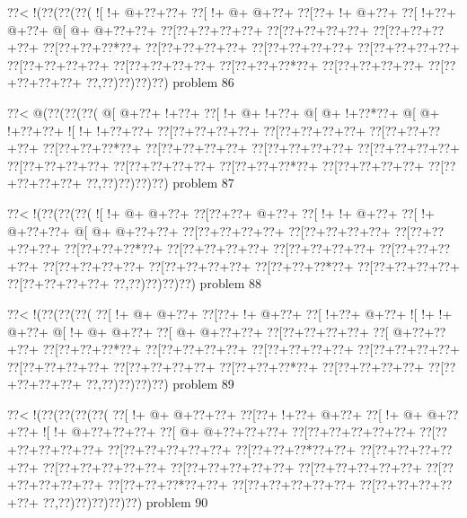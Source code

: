 \vbox{\vbox{\goo
\0??<\- !(\0??(\0??(\0??(
\- ![\- !+\- @+\0??+\0??+
\0??[\- !+\- @+\- @+\0??+
\0??[\0??+\- !+\- @+\0??+
\0??[\- !+\0??+\- @+\0??+
\- @[\- @+\- @+\0??+\0??+
\0??[\0??+\0??+\0??+\0??+
\0??[\0??+\0??+\0??+\0??+
\0??[\0??+\0??+\0??+\0??+
\0??[\0??+\0??+\0??*\0??+
\0??[\0??+\0??+\0??+\0??+
\0??[\0??+\0??+\0??+\0??+
\0??[\0??+\0??+\0??+\0??+
\0??[\0??+\0??+\0??+\0??+
\0??[\0??+\0??+\0??+\0??+
\0??[\0??+\0??+\0??*\0??+
\0??[\0??+\0??+\0??+\0??+
\0??[\0??+\0??+\0??+\0??+
\0??,\0??)\0??)\0??)\0??)
}
\hfil problem 86\hfil\break
}

\vbox{\vbox{\goo
\0??<\- @(\0??(\0??(\0??(
\- @[\- @+\0??+\- !+\0??+
\0??[\- !+\- @+\- !+\0??+
\- @[\- @+\- !+\0??*\0??+
\- @[\- @+\- !+\0??+\0??+
\- ![\- !+\- !+\0??+\0??+
\0??[\0??+\0??+\0??+\0??+
\0??[\0??+\0??+\0??+\0??+
\0??[\0??+\0??+\0??+\0??+
\0??[\0??+\0??+\0??*\0??+
\0??[\0??+\0??+\0??+\0??+
\0??[\0??+\0??+\0??+\0??+
\0??[\0??+\0??+\0??+\0??+
\0??[\0??+\0??+\0??+\0??+
\0??[\0??+\0??+\0??+\0??+
\0??[\0??+\0??+\0??*\0??+
\0??[\0??+\0??+\0??+\0??+
\0??[\0??+\0??+\0??+\0??+
\0??,\0??)\0??)\0??)\0??)
}
\hfil problem 87\hfil\break
}

\vbox{\vbox{\goo
\0??<\- !(\0??(\0??(\0??(
\- ![\- !+\- @+\- @+\0??+
\0??[\0??+\0??+\- @+\0??+
\0??[\- !+\- !+\- @+\0??+
\0??[\- !+\- @+\0??+\0??+
\- @[\- @+\- @+\0??+\0??+
\0??[\0??+\0??+\0??+\0??+
\0??[\0??+\0??+\0??+\0??+
\0??[\0??+\0??+\0??+\0??+
\0??[\0??+\0??+\0??*\0??+
\0??[\0??+\0??+\0??+\0??+
\0??[\0??+\0??+\0??+\0??+
\0??[\0??+\0??+\0??+\0??+
\0??[\0??+\0??+\0??+\0??+
\0??[\0??+\0??+\0??+\0??+
\0??[\0??+\0??+\0??*\0??+
\0??[\0??+\0??+\0??+\0??+
\0??[\0??+\0??+\0??+\0??+
\0??,\0??)\0??)\0??)\0??)
}
\hfil problem 88\hfil\break
}

\vbox{\vbox{\goo
\0??<\- !(\0??(\0??(\0??(
\0??[\- !+\- @+\- @+\0??+
\0??[\0??+\- !+\- @+\0??+
\0??[\- !+\0??+\- @+\0??+
\- ![\- !+\- !+\- @+\0??+
\- @[\- !+\- @+\- @+\0??+
\0??[\- @+\- @+\0??+\0??+
\0??[\0??+\0??+\0??+\0??+
\0??[\- @+\0??+\0??+\0??+
\0??[\0??+\0??+\0??*\0??+
\0??[\0??+\0??+\0??+\0??+
\0??[\0??+\0??+\0??+\0??+
\0??[\0??+\0??+\0??+\0??+
\0??[\0??+\0??+\0??+\0??+
\0??[\0??+\0??+\0??+\0??+
\0??[\0??+\0??+\0??*\0??+
\0??[\0??+\0??+\0??+\0??+
\0??[\0??+\0??+\0??+\0??+
\0??,\0??)\0??)\0??)\0??)
}
\hfil problem 89\hfil\break
}

\vbox{\vbox{\goo
\0??<\- !(\0??(\0??(\0??(\0??(
\0??[\- !+\- @+\- @+\0??+\0??+
\0??[\0??+\- !+\0??+\- @+\0??+
\0??[\- !+\- @+\- @+\0??+\0??+
\- ![\- !+\- @+\0??+\0??+\0??+
\0??[\- @+\- @+\0??+\0??+\0??+
\0??[\0??+\0??+\0??+\0??+\0??+
\0??[\0??+\0??+\0??+\0??+\0??+
\0??[\0??+\0??+\0??+\0??+\0??+
\0??[\0??+\0??+\0??*\0??+\0??+
\0??[\0??+\0??+\0??+\0??+\0??+
\0??[\0??+\0??+\0??+\0??+\0??+
\0??[\0??+\0??+\0??+\0??+\0??+
\0??[\0??+\0??+\0??+\0??+\0??+
\0??[\0??+\0??+\0??+\0??+\0??+
\0??[\0??+\0??+\0??*\0??+\0??+
\0??[\0??+\0??+\0??+\0??+\0??+
\0??[\0??+\0??+\0??+\0??+\0??+
\0??,\0??)\0??)\0??)\0??)\0??)
}
\hfil problem 90\hfil\break
}

